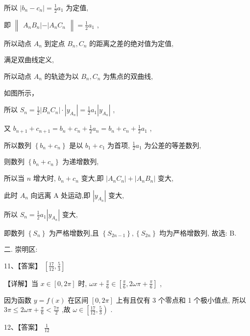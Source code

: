 \documentclass[10pt]{article}
\begin{document}
所以 \(\left| {{b}_{n} - {c}_{n}}\right|  = \frac{1}{2}{a}_{1}\) 为定值,

即 \(\begin{Vmatrix}{{A}_{n}{B}_{n}\left| -\right| {A}_{n}{C}_{n}}\end{Vmatrix} = \frac{1}{2}{a}_{1}\) ,

所以动点 \({A}_{n}\) 到定点 \({B}_{n},{C}_{n}\) 的距离之差的绝对值为定值,

满足双曲线定义,

所以动点 \({A}_{n}\) 的轨迹为以 \({B}_{n},{C}_{n}\) 为焦点的双曲线,

如图所示，

所以 \({S}_{n} = \frac{1}{2}\left| {{B}_{n}{C}_{n}}\right|  \cdot  \left| {y}_{{A}_{n}}\right|  = \frac{1}{2}{a}_{1}\left| {y}_{{A}_{n}}\right|\) ,

又 \({b}_{n + 1} + {c}_{n + 1} = {b}_{n} + {c}_{n} + \frac{1}{2}{a}_{n} = {b}_{n} + {c}_{n} + \frac{1}{2}{a}_{1}\) ,

所以数列 \(\left\{  {{b}_{n} + {c}_{n}}\right\}\) 是以 \({b}_{1} + {c}_{1}\) 为首项, \(\frac{1}{2}{a}_{1}\) 为公差的等差数列,

则数列 \(\left\{  {{b}_{n} + {c}_{n}}\right\}\) 为递增数列,

所以当 \(n\) 增大时, \({b}_{n} + {c}_{n}\) 变大,即 \(\left| {{A}_{n}{C}_{n}}\right|  + \left| {{A}_{n}{B}_{n}}\right|\) 变大,

此时 \({A}_{n}\) 向远离 \(\mathrm{A}\) 处运动,即 \(\left| {y}_{{A}_{n}}\right|\) 变大,

所以 \({S}_{n} = \frac{1}{2}{a}_{1}\left| {y}_{{A}_{n}}\right|\) 变大,

即数列 \(\left\{  {S}_{n}\right\}\) 为严格增数列,且 \(\left\{  {S}_{{2n} - 1}\right\}  ,\left\{  {S}_{2n}\right\}\) 均为严格增数列, 故选: B.

二. 崇明区:

11、【答案】 \(\left\lbrack  {\frac{17}{12},\frac{5}{3}}\right\rbrack\)

【详解】当 \(x \in  \left\lbrack  {0,{2\pi }}\right\rbrack\) 时, \({\omega x} + \frac{\pi }{6} \in  \left\lbrack  {\frac{\pi }{6},{2\omega \pi } + \frac{\pi }{6}}\right\rbrack\) ,

因为函数 \(y = f\left( x\right)\) 在区间 \(\left\lbrack  {0,{2\pi }}\right\rbrack\) 上有且仅有 3 个零点和 1 个极小值点, 所以 \({3\pi } \leq  {2\omega \pi } + \frac{\pi }{6} < \frac{7\pi }{2}\) ,故 \(\omega  \in  \left\lbrack  {\frac{17}{12},\frac{5}{3}}\right)\) .

12、【答案】 \(\frac{1}{12}\)
\end{document}
